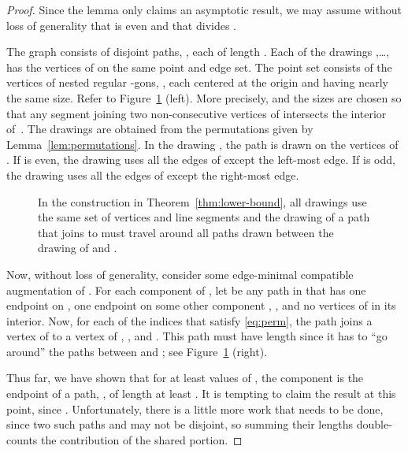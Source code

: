 \documentclass[11pt]{patmorin}
\begin{document}
\begin{proof}
Since the lemma only claims an asymptotic result, we may assume without
loss of generality that  is even and that  divides .

The graph  consists of  disjoint paths,
, each of length .  Each of the
drawings ,\ldots, has the vertices of  on the
same point and edge set. The point set consists of the vertices of
 nested regular -gons, , each centered at the
origin and having nearly the same size. Refer to Figure~\ref{figure:lower-bound} (left). More precisely,  and the sizes are chosen so that any segment
joining two non-consecutive vertices of  intersects the interior
of~.
The drawings  are obtained from the permutations
 given by Lemma~\ref{lem:permutations}.
In the drawing , the path  is drawn on the vertices
of . If  is even, the drawing uses
all the edges of  except the left-most edge.  If  is odd, the
drawing uses all the edges of  except the right-most edge.

\begin{figure}
  \caption{In the construction in Theorem~\ref{thm:lower-bound}, all drawings use the same set of vertices and line segments and the drawing of a path that joins  to  must travel around all paths drawn between the drawing of  and .}
  \label{figure:lower-bound}
\end{figure}

Now, without loss of generality, consider some edge-minimal compatible
augmentation  of .  For each component
 of , let  be any path in  that has
one endpoint on , one endpoint on some other component
, , and no vertices of  in its
interior.
Now, for each of the  indices  that satisfy
\eqref{eq:perm}, the path  joins a vertex of
 to a vertex of , , and .  This path must
have length  since it has to ``go around'' the
paths between  and ; see
Figure~\ref{figure:lower-bound} (right).

Thus far, we have shown that for at least  values of
, the component  is the endpoint of a
path, , of length at least .
It is tempting to claim the result at this point, since
. Unfortunately, there
is a little more work that needs to be done, since two such paths 
and  may not be disjoint, so summing their lengths double-counts
the contribution of the shared portion.


\end{proof}
\end{document}
